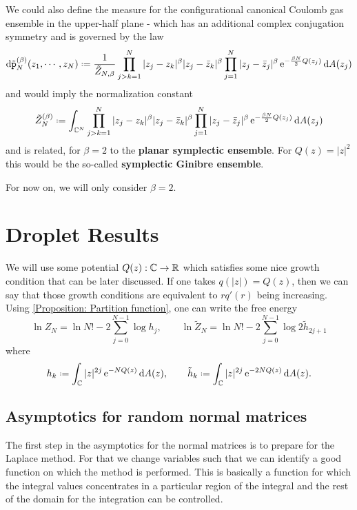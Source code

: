We could also define the measure for the configurational canonical Coulomb gas ensemble in the upper-half plane  - which has an additional complex conjugation symmetry and is governed by the law 
\begin{equation}
	\dd \tilde{\p}_N^{(\beta)} (z_1, \cdots, z_N) \deff \frac{1}{\tilde{Z}_{N,\beta}} \prod_{j > k = 1}^{N} |z_j - z_k|^\beta |z_j - \bar{z}_k|^\beta \prod_{j=1}^{N} |z_j - \bar{z}_j|^\beta  \ee^{- \frac{\beta N}{2} Q(z_j)} \dd A(z_j)
\end{equation}
and would imply the normalization constant
\begin{equation}
		\tilde{Z}_N^{(\beta)} \deff \int_{\C^N} \prod_{j > k = 1}^{N} |z_j - z_k|^\beta |z_j - \bar{z}_k|^\beta \prod_{j=1}^{N} |z_j - \bar{z}_j|^\beta  \ee^{- \frac{\beta N}{2} Q(z_j)} \dd A(z_j)
\end{equation}
and is related, for $\beta = 2$ to the \textbf{planar symplectic ensemble}. For $Q(z) = |z|^2$ this would be the so-called \textbf{symplectic Ginibre ensemble}.

For now on, we will only consider $\beta = 2$.

\section{Droplet Results}

We will use some potential $Q(z) : \mathbb{C} \rightarrow \mathbb{R}$ 
 which satisfies some nice growth condition that can be later discussed. If one takes $q(|z|) = Q(z)$, then we can say that those growth conditions are equivalent to $r q'(r)$ being increasing. Using \eqref{Proposition: Partition function}, one can write the free energy
\begin{equation}
	\ln Z_N = \ln{N!} - 2 \sum_{j=0}^{N-1} \log{h_j},  \qquad \ln \tilde{Z}_N = \ln{N!} - 2 \sum_{j=0}^{N-1} \log{2 \tilde{h}_{2j + 1}}
	\label{Equation: Partition Function}
\end{equation}
where
\begin{equation}
	h_k \deff \int_{\C} |z|^{2j} \ee^{-N Q(z)} \dd A(z), \qquad \tilde{h}_k \deff \int_{\C} |z|^{2j} \ee^{- 2 N Q(z)} \dd A(z).
\end{equation} 

\subsection{Asymptotics for random normal matrices}

The first step in the asymptotics for the normal matrices is to prepare for the Laplace method. For that we change variables such that we can identify a good function on which the method is performed. This is basically a function for which the integral values concentrates in a particular region of the integral and the rest of the domain for the integration can be controlled.

